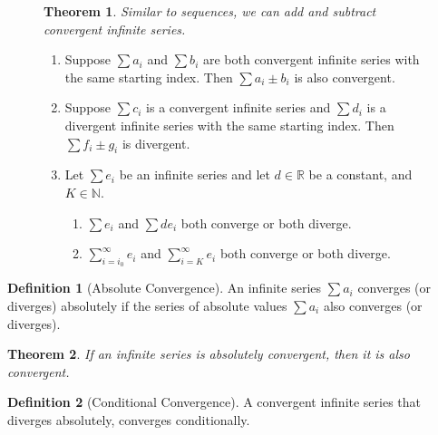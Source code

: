 \documentclass{article}
\newcommand*{\N}{\mathbb{N}}
\newcommand*{\R}{\mathbb{R}}
\theoremstyle{plain}
\newtheorem{theorem}{Theorem}[section]
\numberwithin{theorem}{subsection}
\theoremstyle{definition}
\newtheorem{definition}{Definition}[section]
\numberwithin{definition}{subsection}
\theoremstyle{remark}
\numberwithin{note}{subsection}
\begin{document}
\begin{figure}[H]
	\begin{mdframed}[style=exampledefault]
		\begin{theorem}
			Similar to sequences, we can add and subtract convergent infinite series.
		\end{theorem}

		\begin{enumerate}
			\item Suppose $\sum a_i$ and $\sum b_i$ are both convergent infinite series with the same starting index. Then $\sum a_i \pm b_i$ is also convergent.
			\item Suppose $\sum c_i$ is a convergent infinite series and $\sum d_i$ is a divergent infinite series with the same starting index. Then $\sum f_i \pm g_i$ is divergent.
			\item Let $\sum e_i$ be an infinite series and let $d\in\R$ be a constant, and $K\in\N$.
			\begin{enumerate}
				\item $\sum e_i$ and $\sum d e_i$ both converge or both diverge.
				\item $\sum_{i=i_0}^\infty e_i$ and $\sum_{i=K}^\infty e_i$ both converge or both diverge.
			\end{enumerate}
		\end{enumerate}

	\end{mdframed}
\end{figure}
%
\begin{definition}[Absolute Convergence]
	An infinite series $\sum a_i$ converges (or diverges) absolutely if the series of absolute values $\sum a_i$ also converges (or diverges).
\end{definition}
\begin{theorem}
	If an infinite series is absolutely convergent, then it is also convergent.
\end{theorem}
%
\begin{definition}[Conditional Convergence]
	A convergent infinite series that diverges absolutely, converges conditionally.
\end{definition}
%
\pagebreak
\end{document}
